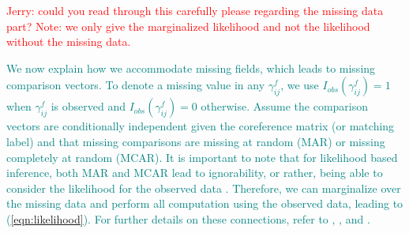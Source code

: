 \documentclass[ba]{imsart}
\begin{document}

\textcolor{red}{Jerry: could you read through this carefully please regarding the missing data part? Note: we only give the marginalized likelihood and not the likelihood without the missing data.} 

\textcolor{teal}{We now explain how we accommodate missing fields, which leads to missing comparison vectors. To denote a missing value in any $\gamma_{ij}^f$, we use $I_{obs}(\gamma_{ij}^f)=1$ when $\gamma_{ij}^f$ is observed and $I_{obs}(\gamma_{ij}^f)=0$ otherwise. Assume the comparison vectors are conditionally independent given the coreference matrix (or matching label) and that missing comparisons are missing at random (MAR) or missing completely at random (MCAR). It is important to note that for likelihood based inference, both MAR and MCAR lead to ignorability, or rather, being able to consider the likelihood for the observed data \citep[Section 6.2]{LittleRubin2002}. Therefore, we can marginalize over the missing data and perform all computation using the observed data, leading to (\ref{eqn:likelihood}). For further details on these connections, refer to \cite[Section 6.2]{LittleRubin2002}, \cite[Section 3.1]{sadinle_detecting_2014}, and \citep[Section 4.2]{sadinle_bayesian_2017}.
}



\end{document}
